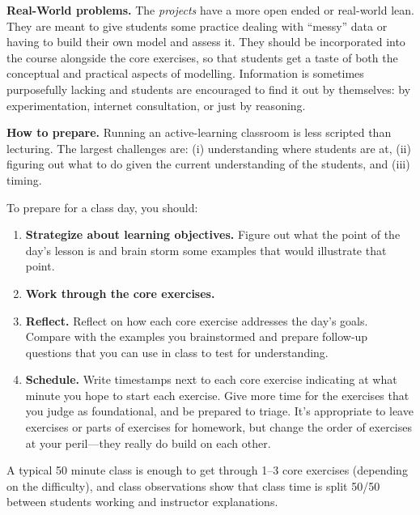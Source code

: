 {\bf Real-World problems.} 
The \emph{projects} have a more open ended or real-world lean. They are meant to give students some practice dealing with ``messy'' data or having to build their own model and assess it. They should be incorporated into the course alongside the core exercises, so that students get a taste of both the conceptual and practical aspects of modelling. Information is sometimes purposefully lacking and students are encouraged to find it out by themselves: by experimentation, internet consultation, or just by reasoning. 

{\bf How to prepare.}
Running an active-learning classroom is less scripted than lecturing.
The largest challenges are: (i) understanding where students are at, (ii) figuring out what to do given the current understanding of the students, and (iii) timing.

To prepare for a class day, you should:
\begin{enumerate}
	\item {\bf Strategize about learning objectives.} Figure out what the point of the day's lesson is and brain storm some examples that would illustrate that point.
	\item {\bf Work through the core exercises.} 
	\item {\bf Reflect.} Reflect on how each core exercise addresses the day's goals. Compare with the examples you brainstormed and prepare follow-up questions that you can use in class to test for understanding.
	\item {\bf Schedule.} Write timestamps next to each core exercise indicating at what minute you hope to start each exercise. Give more time for the exercises that you judge as foundational, and be prepared to triage. It's appropriate to leave exercises or parts of exercises for homework, but change the order	of exercises at your peril---they really do build on each other.
\end{enumerate}

A typical 50 minute class is enough to get through 1--3 core exercises (depending on the difficulty), and class observations show that class time is split 50/50 between students working and instructor explanations.

